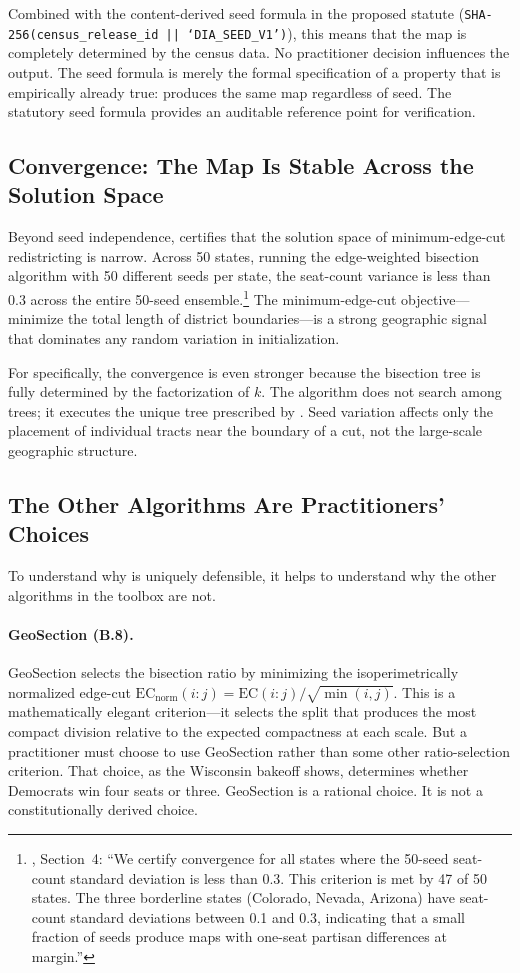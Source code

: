 Combined with the content-derived seed formula in the proposed statute
(\texttt{SHA-256(census\_release\_id || `DIA\_SEED\_V1')}), this means
that the map is completely determined by the census data.
No practitioner decision influences the output.
The seed formula is merely the formal specification of a property that is
empirically already true: \ar{} produces the same map regardless of seed.
The statutory seed formula provides an auditable reference point for
verification.

\subsection{Convergence: The Map Is Stable Across the Solution Space}

Beyond seed independence, \citet{b7paper} certifies that the solution space
of minimum-edge-cut redistricting is narrow.
Across 50 states, running the edge-weighted bisection algorithm with 50
different seeds per state, the seat-count variance is less than 0.3 across
the entire 50-seed ensemble.\footnote{%
  \citet{b7paper}, Section~4: ``We certify convergence for all states where
  the 50-seed seat-count standard deviation is less than 0.3.
  This criterion is met by 47 of 50 states.
  The three borderline states (Colorado, Nevada, Arizona) have seat-count
  standard deviations between 0.1 and 0.3, indicating that a small fraction
  of seeds produce maps with one-seat partisan differences at margin.''
}
The minimum-edge-cut objective---minimize the total length of district
boundaries---is a strong geographic signal that dominates any random
variation in initialization.

For \ar{} specifically, the convergence is even stronger because the
bisection tree is fully determined by the factorization of $k$.
The algorithm does not search among trees; it executes the unique tree
prescribed by \hh{}.
Seed variation affects only the placement of individual tracts near the
boundary of a cut, not the large-scale geographic structure.

\subsection{The Other Algorithms Are Practitioners' Choices}

To understand why \ar{} is uniquely defensible, it helps to understand
why the other algorithms in the toolbox are not.

\paragraph{GeoSection (B.8).}
GeoSection \citep{b8paper} selects the bisection ratio by minimizing the
isoperimetrically normalized edge-cut $\mathrm{EC}_\text{norm}(i:j) = \mathrm{EC}(i:j)/\sqrt{\min(i,j)}$.
This is a mathematically elegant criterion---it selects the split that
produces the most compact division relative to the expected compactness
at each scale.
But a practitioner must choose to use GeoSection rather than some other
ratio-selection criterion.
That choice, as the Wisconsin bakeoff shows, determines whether Democrats
win four seats or three.
GeoSection is a rational choice.
It is not a constitutionally derived choice.

